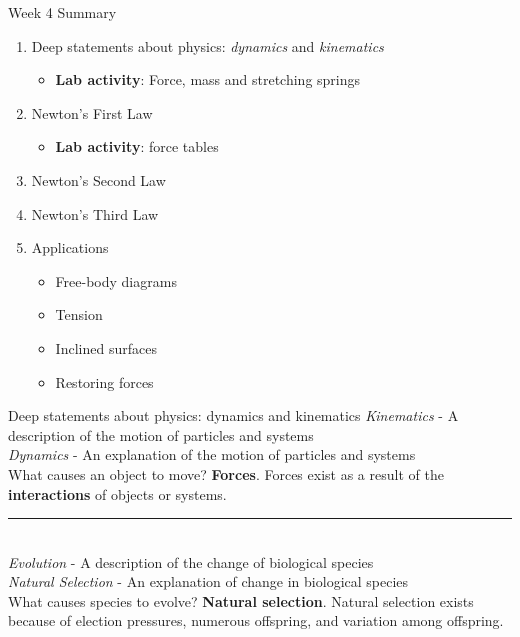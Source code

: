 \documentclass{beamer}
\begin{document}
\begin{frame}{Week 4 Summary}
\begin{enumerate}
\item Deep statements about physics: \textit{dynamics} and \textit{kinematics}
\begin{itemize}
\item \textbf{Lab activity}: Force, mass and stretching springs
\end{itemize}
\item Newton's \alert{First Law}
\begin{itemize}
\item \textbf{Lab activity}: force tables
\end{itemize}
\item Newton's \alert{Second Law}
\item Newton's \alert{Third Law}
\item Applications
\begin{itemize}
\item Free-body diagrams
\item Tension
\item Inclined surfaces
\item Restoring forces
\end{itemize}
\end{enumerate}
\end{frame}

\begin{frame}{Deep statements about physics: dynamics and kinematics}
\small
\textit{Kinematics} - A \alert{description} of the motion of particles and systems \\
\textit{Dynamics} - An \alert{explanation} of the motion of particles and systems \\
\vspace{0.25cm}
What causes an object to move?  \textbf{Forces}.  Forces exist as a result of the \alert{\textbf{interactions}} of objects or systems.\\
\vspace{0.25cm}
\rule{10cm}{0.4pt} \\
\vspace{0.25cm}
\textit{Evolution} - A \alert{description} of the change of biological species \\
\textit{Natural Selection} - An \alert{explanation} of change in biological species \\
\vspace{0.25cm}
What causes species to evolve?  \textbf{Natural selection}.  Natural selection exists because of \alert{election pressures}, \alert{numerous offspring}, and \alert{variation} among offspring.
\end{frame}
\end{document}
